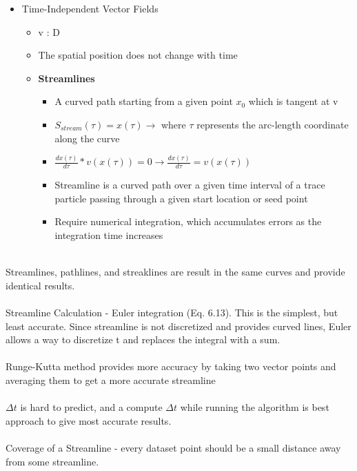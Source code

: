 \documentclass{article}
\begin{document}
\begin{itemize}
    \item Time-Independent Vector Fields 
    \begin{itemize}
        \item v : D
        \item The spatial position does not change with time
        \item \textbf{Streamlines} %
        \begin{itemize}
            \item A curved path starting from a given point $x_0$ which is tangent at v
            \item $S_{stream}(\tau) = x(\tau) \rightarrow$ where $\tau$ represents the arc-length coordinate along the curve
            \item $\frac{dx(\tau)}{d\tau} * v(x(\tau)) = 0 \rightarrow \frac{dx(\tau)}{d\tau} = v(x(\tau))$
            \item Streamline is a curved path over a given time interval of a trace particle passing through a given start location or seed point
            \item Require numerical integration, which accumulates errors as the integration time increases
        \end{itemize}
    \end{itemize} 
\end{itemize}
\\
Streamlines, pathlines, and streaklines are result in the same curves and provide identical results.
\\\\
Streamline Calculation - Euler integration (Eq. 6.13). This is the simplest, but least accurate. Since streamline is not discretized and provides curved lines, Euler allows a way to discretize t and replaces the integral with a sum.
\\\\
Runge-Kutta method provides more accuracy by taking two vector points and averaging them to get a more accurate streamline
\\\\
$\Delta t$ is hard to predict, and a compute $\Delta t$ while running the algorithm is best approach to give most accurate results.
\\\\
Coverage of a Streamline - every dataset point should be a small distance away from some streamline. 
\\\\
\end{document}
